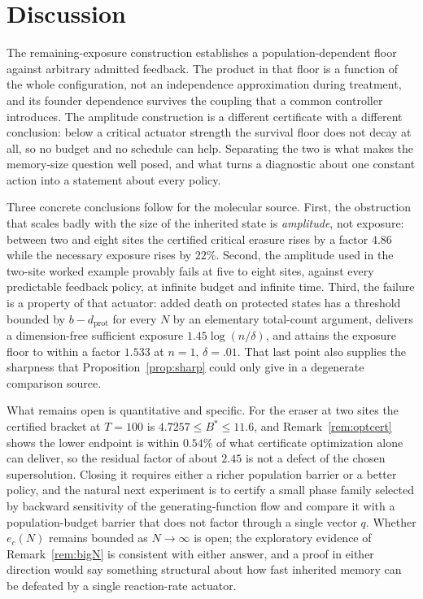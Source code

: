 \section{Discussion}
\label{sec:disc}

The remaining-exposure construction establishes a population-dependent floor
against arbitrary admitted feedback. The product in that floor is a function of
the whole configuration, not an independence approximation during treatment, and
its founder dependence survives the coupling that a common controller
introduces. The amplitude construction is a different certificate with a
different conclusion: below a critical actuator strength the survival floor does
not decay at all, so no budget and no schedule can help. Separating the two is
what makes the memory-size question well posed, and what turns a diagnostic
about one constant action into a statement about every policy.

Three concrete conclusions follow for the molecular source. First, the
obstruction that scales badly with the size of the inherited state is
\emph{amplitude}, not exposure: between two and eight sites the certified
critical erasure rises by a factor $4.86$ while the necessary exposure rises by
$22\%$. Second, the amplitude used in the two-site worked example provably fails
at five to eight sites, against every predictable feedback policy, at infinite
budget and infinite time. Third, the failure is a property of that actuator:
added death on protected states has a threshold bounded by $b-d_{\mathrm{prot}}$
for every $N$ by an elementary total-count argument, delivers a dimension-free
sufficient exposure $1.45\log(n/\delta)$, and attains the exposure floor to
within a factor $1.533$ at $n=1$, $\delta=.01$. That last point also supplies
the sharpness that Proposition~\ref{prop:sharp} could only give in a degenerate
comparison source.

What remains open is quantitative and specific. For the eraser at two sites the
certified bracket at $T=100$ is $4.7257\le B^*\le11.6$, and
Remark~\ref{rem:optcert} shows the lower endpoint is within $0.54\%$ of what
certificate optimization alone can deliver, so the residual factor of about
$2.45$ is not a defect of the chosen supersolution. Closing it requires either a
richer population barrier or a better policy, and the natural next experiment is
to certify a small phase family selected by backward sensitivity of the
generating-function flow and compare it with a population-budget barrier that
does not factor through a single vector $q$. Whether $e_c(N)$ remains bounded as
$N\to\infty$ is open; the exploratory evidence of Remark~\ref{rem:bigN} is
consistent with either answer, and a proof in either direction would say
something structural about how fast inherited memory can be defeated by a
single reaction-rate actuator.

